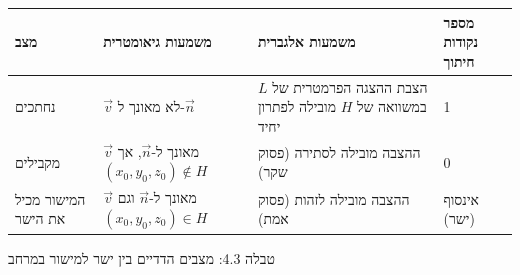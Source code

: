 \documentclass[12pt]{report}
\theoremstyle{plain}
\theoremstyle{definition}
\newcommand{\0}{\mathbf{0}}
\begin{document}
\begin{table}[H]
\centering
\begin{tabular}{|>{\raggedleft\arraybackslash}p{2.5cm}|>{\raggedleft\arraybackslash}p{3cm}|>{\raggedleft\arraybackslash}p{3cm}|>{\raggedleft\arraybackslash}p{2.5cm}|}
\hline
\texthebrew{\textbf{מצב}} & \texthebrew{\textbf{משמעות גיאומטרית}} & \texthebrew{\textbf{משמעות אלגברית}} & \texthebrew{\textbf{מספר נקודות חיתוך}} \\ \hline
\texthebrew{נחתכים} & \texthebrew{$\vec{v}$ לא מאונך ל-$\vec{n}$} & \texthebrew{הצבת ההצגה הפרמטרית של $L$ במשוואה של $H$ מובילה לפתרון יחיד} & \texthebrew{1} \\ \hline
\texthebrew{מקבילים} & \texthebrew{$\vec{v}$ מאונך ל-$\vec{n}$, אך $(x_0,y_0,z_0)\notin H$} & \texthebrew{ ההצבה מובילה לסתירה (פסוק שקר)} & \texthebrew{0} \\ \hline
\texthebrew{המישור מכיל את הישר} & \texthebrew{$\vec{v}$ מאונך ל-$\vec{n}$ וגם $(x_0,y_0,z_0)\in H$} & \texthebrew{ההצבה מובילה לזהות (פסוק אמת)} & \texthebrew{אינסוף (ישר)} \\ \hline
\end{tabular}

\smallskip
{\small טבלה 4.3: מצבים הדדיים בין ישר למישור במרחב}
\end{table}
\end{document}
